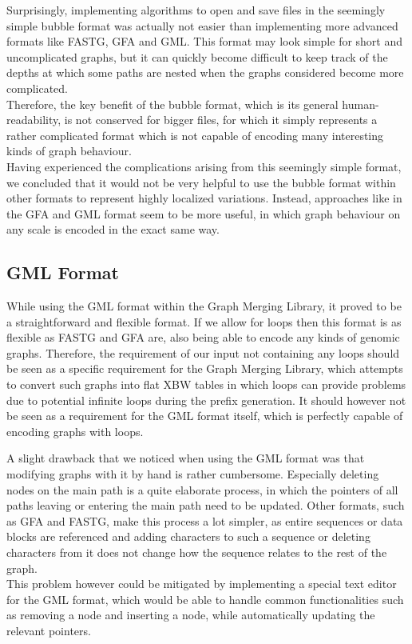 \documentclass[a4paper,12pt,twoside,BCOR=10mm]{scrbook}
\begin{document}
Surprisingly, implementing algorithms to open and save files in the seemingly simple bubble format was actually
not easier than implementing more advanced formats like FASTG, GFA and GML.
This format may look simple for short and uncomplicated graphs,
but it can quickly become difficult to keep track of the depths at which some paths
are nested when the graphs considered become more complicated. \\
Therefore, the key benefit of the bubble format, which is its general human-readability,
is not conserved for bigger files, for which it simply represents a rather complicated format
which is not capable of encoding many interesting kinds of graph behaviour. \\
Having experienced the complications arising from this seemingly simple format,
we concluded that it would not be very helpful to use the bubble format within
other formats to represent highly localized variations.
Instead, approaches like in the GFA and GML format seem to be more useful,
in which graph behaviour on any scale is encoded in the exact same way.

\subsection{GML Format}

While using the GML format within the Graph Merging Library,
it proved to be a straightforward and flexible format.
If we allow for loops then this format is as flexible as FASTG and GFA are,
also being able to encode any kinds of genomic graphs.
Therefore, the requirement of our input not containing any loops should be
seen as a specific requirement for the Graph Merging Library, which attempts
to convert such graphs into flat XBW tables in which loops can provide problems
due to potential infinite loops during the prefix generation.
It should however not be seen as a requirement for the GML format itself,
which is perfectly capable of encoding graphs with loops.

A slight drawback that we noticed when using the GML format was that
modifying graphs with it by hand is rather cumbersome.
Especially deleting nodes on the main path is a quite elaborate process,
in which the pointers of all paths leaving or entering the main path
need to be updated.
Other formats, such as GFA and FASTG, make this process a lot simpler,
as entire sequences or data blocks are referenced and adding characters to such a
sequence or deleting characters from it does not change how the sequence
relates to the rest of the graph. \\
This problem however could be mitigated by implementing a special text editor
for the GML format, which would be able to handle common functionalities such as
removing a node and inserting a node, while automatically updating the relevant pointers.
\end{document}
